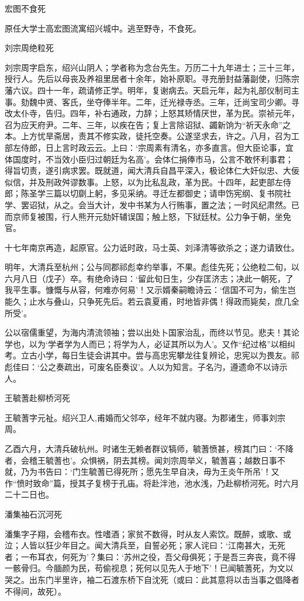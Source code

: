 \documentclass[]{article}
\begin{document}
宏图不食死

原任大学士高宏图流寓绍兴城中。逃至野寺，不食死。

刘宗周绝粒死

刘宗周字启东，绍兴山阴人；学者称为念台先生。万历二十九年进士；三十三年，授行人。先后以母丧及养祖里居者十余年，始补原职。寻充册封益藩副使，归陈宗藩六议。四十一年，疏请修正学。明年，复谢病去。天启元年，起为礼部仪制司主事。劾魏中贤、客氏，坐夺俸半年。二年，迁光禄寺丞。三年，迁尚宝司少卿。寻改太仆寺，告归。四年，补右通政，力辞；上怒其矫情厌世，革为民。崇祯元年，召为应天府尹。二年、三年，以疾在告；复上言除诏狱、蠲新饷为``祈天永命''之本。上方忧旱斋居，责其不修实政，徒托空奏。公遂坚求去，许之。八月，召为工部左侍郎，日上言时政云云。上曰：`宗周素有清名，亦多直言。但大臣论事，宜体国度时，不当效小臣归过朝廷为名高'。会体仁捐俸市马，公言不敢怀利事君；得旨切责，遂引病求罢。既就道，闻大清兵自昌平深入，极论体仁大奸似忠、大佞似信，并及刑政舛谬数事。上怒，以为比私乱政，革为民。十四年，起吏部左侍郎；陈圣学三篇以切劘上躬，多见采纳。寻迁左都御史；请申饬宪纲、复书院社学、罢诏狱，从之。会当大计，发中书某为人行贿事，置之法；一时风纪肃然。已而京师复被围，行人熊开元劾奸辅误国；触上怒，下狱廷杖。公力争于朝，坐免官。

十七年南京再造，起原官。公力诋时政，马士英、刘泽清等欲杀之；遂力请致仕。

明年，大清兵至杭州；公与同郡祁彪幸约举事，不果。彪佳先死；公绝粒二旬，以六月八日（戊子）卒。有绝命诗曰：`留此旬日生，少存匡济志；决此一朝死，了我平生事。慷慨与从容，何难亦何易'！又示婿秦嗣瞻诗云：`信国不可为，偷生岂能久；止水与叠山，只争死先后。若云袁夏甫，时地皆非偶！得政而毙矣，庶几全所受'。

公以宿儒重望，为海内清流领袖；尝以出处卜国家治乱，而终以节见。悲夫！其论学也，以为`学者学为人而已；将学为人，必证其所以为人'。又作``纪过格''以相纠考。立古小学，每日生徒会讲其中。尝与高忠宪攀龙往复辨论，忠宪以为畏友。祁彪佳曰：`公之奏疏出，可废名臣奏议'。人以为知言。子名汋，遵遗命不以诗示人。

王毓蓍赴柳桥河死

王毓蓍字元祉。绍兴卫人,甫婚而父邻卒，经年不就内寝。为郡诸生，师事刘宗周。

乙酉六月，大清兵破杭州。时诸生无赖者群议犒师，毓蓍愤甚，榜其门曰：`不降者，会稽王毓蓍也'。众惧祸，阴去其榜。闻刘宗周举义，毓蓍喜；越数日事不就，乃为书告曰：`门生毓蓍已得死所；愿先生早自决，毋为王炎午所吊'！又作``愤时致命''篇，授其子复榜于孔庙。将赴泮池，池水浅，乃赴柳桥河死。时六月二十二日也。

潘集袖石沉河死

潘集字子翔，会稽布衣。性嗜酒；家贫不数得，时从友人索饮。既醉，或歌、或泣；人皆以狂少年目之。闻大清兵至，自誓必死；家人诧曰：`江南甚大，无死者；一布耳衣，何死为'？集曰：`苏州之役，吾父母俱死；于是吾三奔丧，竟不得一骸骨归。今腼颜为民，苟偷视息；死何以见先人于地下'！已闻毓蓍死，为文以哭之。出东门半里许，袖二石渡东桥下自沈死（或曰：此其意将以击当事之倡降者不得间，故死）。
\end{document}
